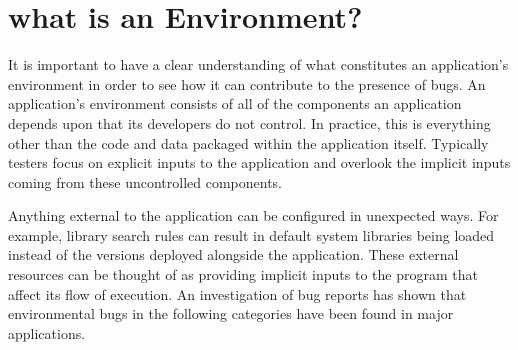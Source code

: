 \section{what is an Environment?}
\label{SEC:background}

It is important
to have a clear understanding
of what constitutes an application's environment
in order to see how it can contribute to the presence of bugs.
An application's environment consists of
all of the components an application depends upon
that its developers do not control.
In practice, this is everything other than the code and data packaged
within the application itself.
Typically testers
focus on explicit inputs to the application
and overlook the implicit inputs
coming from these uncontrolled components.

Anything external to the application can be
configured in unexpected ways.
For example, library search rules can result in default system libraries
being loaded instead of
the versions deployed alongside the application.
These external resources can be thought of as
providing implicit inputs to the program that affect its flow of execution.
An investigation of bug reports has shown that environmental bugs in the
following categories have been found in major applications.

